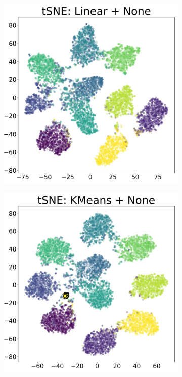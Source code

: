 \documentclass[10pt,twocolumn,letterpaper]{article}
\begin{document}
\begin{figure}[ht]
	\centering
	\begin{subfigure}[t]{.24\textwidth}
		\includegraphics[width=\textwidth]{figures/id-00000001-tsne.jpg}
		\subcaption{}
	\end{subfigure}
	\begin{subfigure}[t]{.24\textwidth}
		\includegraphics[width=\textwidth]{figures/id-00000013-tsne.jpg}

\end{subfigure}
\end{figure}
\end{document}
